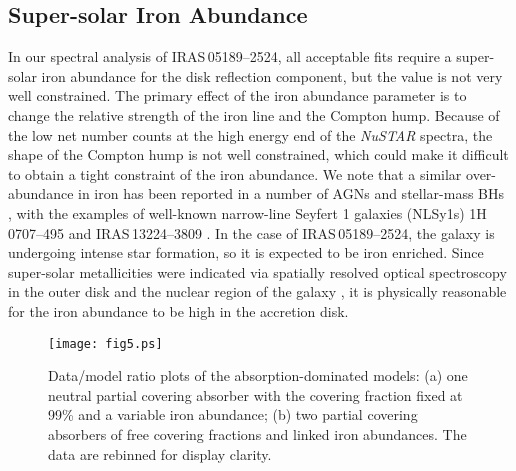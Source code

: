 \documentclass[]{emulateapj}
\def \nustar {{\em NuSTAR }}
\begin{document}
\subsection{Super-solar Iron Abundance}
In our spectral analysis of {IRAS\,05189--2524}, all acceptable fits require a super-solar iron abundance for the disk reflection component, but the value is not very well constrained. The primary effect of the iron abundance parameter is to change the relative strength of the iron line and the Compton hump. Because of the low net number counts at the high energy end of the \nustar spectra, the shape of the Compton hump is not well constrained, which could make it difficult to obtain a tight constraint of the iron abundance. We note that a similar over-abundance in iron has been reported in a number of AGNs \citep[e.g.,][]{ris09,pat11} and stellar-mass BHs \citep[e.g.,][]{gar15b}, with the examples of well-known narrow-line Seyfert 1 galaxies (NLSy1s) 1H\,0707--495 \citep{dau12,kar15} and IRAS\,13224--3809 \citep{fab13}. In the case of {IRAS\,05189--2524}, the galaxy is undergoing intense star formation, so it is expected to be iron enriched. Since super-solar metallicities were indicated via spatially resolved optical spectroscopy in the outer disk and the nuclear region of the galaxy \citep{wes12}, it is physically reasonable for the iron abundance to be high in the accretion disk.

\begin{figure}
\centering
\texttt{[image: fig5.ps]}
\caption{Data/model ratio plots of the absorption-dominated models: (a) one neutral partial covering absorber with the covering fraction fixed at 99\% and a variable iron abundance; (b) two partial covering absorbers of free covering fractions and linked iron abundances. The data are rebinned for display clarity. 
\label{fig:fig5}}
\end{figure}
\end{document}

